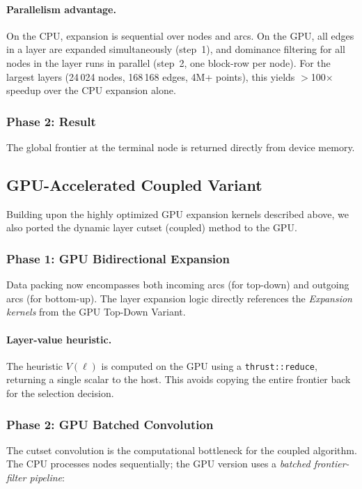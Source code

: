 \documentclass[11pt]{article}
\begin{document}
\paragraph{Parallelism advantage.}
On the CPU, expansion is sequential over nodes and arcs.
On the GPU, all edges in a layer are expanded simultaneously (step~1),
and dominance filtering for all nodes in the layer runs in parallel
(step~2, one block-row per node).
For the largest layers (24\,024 nodes, 168\,168 edges, 4M+ points),
this yields $>$100$\times$ speedup over the CPU expansion alone.

\subsubsection{Phase 2: Result}
The global frontier at the terminal node is returned directly from device memory.


\subsection{GPU-Accelerated Coupled Variant}

Building upon the highly optimized GPU expansion kernels described above,
we also ported the dynamic layer cutset (coupled) method to the GPU.

\subsubsection{Phase 1: GPU Bidirectional Expansion}
Data packing now encompasses both incoming arcs (for top-down) and outgoing arcs (for bottom-up).
The layer expansion logic directly references the \emph{Expansion kernels} from the GPU Top-Down Variant.

\paragraph{Layer-value heuristic.}
The heuristic $V(\ell)$ is computed on the GPU using a
\texttt{thrust::reduce}, returning a single scalar to the host.
This avoids copying the entire frontier back for the selection decision.

\subsubsection{Phase 2: GPU Batched Convolution}

The cutset convolution is the computational bottleneck for the coupled algorithm.
The CPU processes nodes sequentially; the GPU version uses a
\emph{batched frontier-filter pipeline}:
\end{document}
